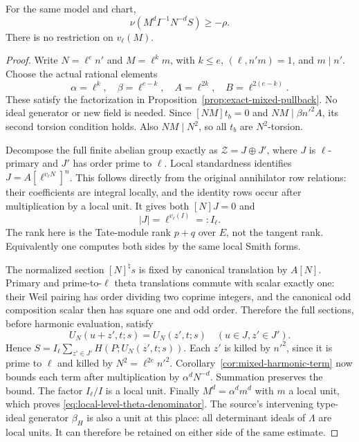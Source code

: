 \begin{theorem}\label{thm:local-level-theta-denominator}
For the same model and chart,
\begin{equation}\label{eq:local-level-theta-denominator}
                  \nu(M^d I^{-1}N^{-d}S)\geq-\rho.
\end{equation}
There is no restriction on $v_\ell(M)$.
\end{theorem}
\begin{proof}
Write $N=\ell^e n'$ and $M=\ell^k m$, with $k\leq e$,
$(\ell,n'm)=1$, and $m\mid n'$.  Choose the actual rational elements
\[
 \alpha=\ell^k,\quad\beta=\ell^{e-k},\quad
 A=\ell^{2k},\quad B=\ell^{2(e-k)}.
\]
These satisfy the factorization in
Proposition~\ref{prop:exact-mixed-pullback}.  No ideal generator or
new field is needed.  Since $[NM]t_b=0$ and
$NM\mid\beta n'^2A$, its second torsion condition holds.  Also
$NM\mid N^2$, so all $t_b$ are $N^2$-torsion.

Decompose the full finite abelian group exactly as
$\mathcal Z=J\oplus J'$, where $J$ is $\ell$-primary and $J'$ has
order prime to $\ell$.  Local standardness identifies
$J=A[\ell^{v_\ell N}]^n$.  This follows directly from the original
annihilator row relations: their coefficients are integral locally,
and the identity rows occur after multiplication by a local unit.
It gives both $[N]J=0$ and
\[
             |J|=\ell^{v_\ell(I)}=:I_\ell.
\]
The rank here is the Tate-module rank $p+q$ over $E$, not the tangent
rank.  Equivalently one computes both sides by the same local Smith
forms.

The normalized section $[N]^\natural s$ is fixed by canonical
translation by $A[N]$.  Primary and prime-to-$\ell$ theta translations
commute with scalar exactly one: their Weil pairing has order dividing
two coprime integers, and the canonical odd composition scalar then
has square one and odd order.  Therefore the full sections, before
harmonic evaluation, satisfy
\[
 U_N(u+z',t;s)=U_N(z',t;s)\quad(u\in J, z'\in J').
\]
Hence $S=I_\ell\sum_{z'\in J'}H(P;U_N(z',t;s))$.
Each $z'$ is killed by $n'^2$, since it is prime to $\ell$ and killed
by $N^2=\ell^{2e}n'^2$.
Corollary~\ref{cor:mixed-harmonic-term} now bounds each term after
multiplication by $\alpha^dN^{-d}$.  Summation preserves the bound.
The factor $I_\ell/I$ is a local unit.  Finally
$M^d=\alpha^d m^d$ with $m$ a local unit, which proves
\eqref{eq:local-level-theta-denominator}.
The source's intervening type-ideal generator $\beta_H$ is also a unit
at this place: all determinant ideals of $\Lambda$ are local units.
It can therefore be retained on either side of the same estimate.
\end{proof}

